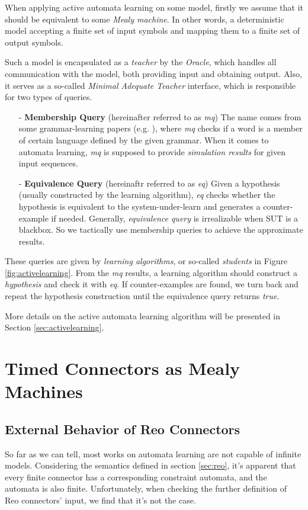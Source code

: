 \documentclass[conference, a4paper]{IEEEtran}
\begin{document}
When applying active automata learning on some model, firstly we assume that it should be equivalent
to some \emph{Mealy machine}. In other words, a deterministic model accepting a finite set of input
symbols and mapping them to a finite set of output symbols.

Such a model is encapsulated as a \emph{teacher} by the \emph{Oracle}, which handles
all communication with the model, both providing input and obtaining output. Also, it serves as a
so-called \emph{Minimal Adequate Teacher} interface, which is responsible for two types of
queries. 

\begin{itemize}
  \item[-] \textbf{Membership Query} (hereinafter referred to as \emph{mq}) The name comes from
    some grammar-learning papers (e.g. \cite{DBLP:journals/iandc/Angluin87}), where \emph{mq} checks
    if a word is a member of certain language defined by the given grammar. When it comes to
    automata learning, \emph{mq} is supposed to provide \emph{simulation results} for given input
    sequences.
  \item[-] \textbf{Equivalence Query} (hereinaftr referred to as \emph{eq}) Given a hypothesis
    (usually constructed by the learning algorithm), \emph{eq} checks whether the hypothesis is
    equivalent to the system-under-learn and generates a counter-example if needed. Generally, 
    \emph{equivalence query} is irrealizable when SUT is a blackbox. So we tactically use membership
    queries to achieve the approximate results.
\end{itemize}

These queries are given by \emph{learning algorithms}, or so-called \emph{students} in Figure
\ref{fig:activelearning}. From the \emph{mq} results, a learning algorithm should construct a
\emph{hypothesis} and check it with \emph{eq}. If counter-examples are found, we turn back and
repeat the hypothesis construction until the equivalence query returns \emph{true}.

More details on the active automata learning algorithm will be presented in Section
\ref{sec:activelearning}. 

\section{Timed Connectors as Mealy Machines}
\label{sec:semantics}
\subsection{External Behavior of Reo Connectors}
So far as we can tell, most
works\cite{DBLP:conf/fase/RaffeltS06, DBLP:journals/corr/ChenHLLTWW15} on automata learning are not
capable of infinite models.  Considering the semantics defined in section
\ref{sec:reo}, it's apparent that every finite connector has a corresponding constraint
automata, and the automata is also finite. Unfortunately, when checking the further definition of
Reo connectors' input, we find that it's not the case.
\end{document}
